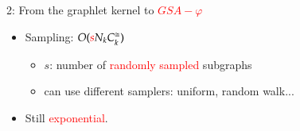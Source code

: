 \documentclass[final,dvipsnames]{beamer}
\newcommand{\vsp}{\vspace{10pt}}
\newcommand{\myemph}[1]{\textcolor{red}{#1}}
\begin{document}
\begin{frame}{}
\begin{columns}[t]
\begin{column}{0.45\linewidth}
\begin{block}{2: From the graphlet kernel to \myemph{$GSA-\varphi$}}
\begin{minipage}{.99\linewidth}
\begin{mynotablock}
{\begin{itemize}
\begin{itemize}
						\item {\small $N_k C^{\cong}_k$: cost of \myemph{graphlet matching}, doubly exponential in $k$}
					\end{itemize}
					\vsp\vsp
					\item Sampling: $O(\textcolor{red}{s}N_k C^{\cong}_k)$ \vsp
					\begin{itemize}
						\item {\small $s$: number of \myemph{randomly sampled} subgraphs}
						\item {\small can use different samplers: uniform, random walk...}
					\end{itemize}
					\vsp\vsp
					\item Still \myemph{exponential}.
				\end{itemize}
			}
		
		\end{mynotablock}
	\end{minipage}


\end{block}
\end{column}
\end{columns}
\end{frame}
\end{document}
